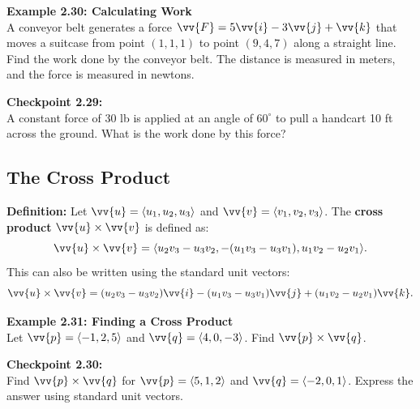 \documentclass{article}
\begin{document}
\begin{examplebox}
    \textbf{Example 2.30: Calculating Work} \\
    A conveyor belt generates a force \(\vv{F} = 5\vv{i} - 3\vv{j} + \vv{k}\) that moves a suitcase from point \((1, 1, 1)\) to point \((9, 4, 7)\) along a straight line. Find the work done by the conveyor belt. The distance is measured in meters, and the force is measured in newtons.
\end{examplebox}

\begin{exercisebox}
    \textbf{Checkpoint 2.29:} \\
    A constant force of 30 lb is applied at an angle of \(60^\circ\) to pull a handcart 10 ft across the ground. What is the work done by this force?
\end{exercisebox}

\subsection*{The Cross Product}

\begin{definitionbox}
    \textbf{Definition:} Let \(\vv{u} = \langle u_1, u_2, u_3 \rangle\) and \(\vv{v} = \langle v_1, v_2, v_3 \rangle\). The \textbf{cross product} \(\vv{u} \times \vv{v}\) is defined as:
    \[
    \vv{u} \times \vv{v} = \langle u_2 v_3 - u_3 v_2, -(u_1 v_3 - u_3 v_1), u_1 v_2 - u_2 v_1 \rangle.
    \]
    This can also be written using the standard unit vectors:
    \[
    \vv{u} \times \vv{v} = (u_2 v_3 - u_3 v_2) \vv{i} - (u_1 v_3 - u_3 v_1) \vv{j} + (u_1 v_2 - u_2 v_1) \vv{k}.
    \]
\end{definitionbox}

\begin{examplebox}
    \textbf{Example 2.31: Finding a Cross Product} \\
    Let \(\vv{p} = \langle -1, 2, 5 \rangle\) and \(\vv{q} = \langle 4, 0, -3 \rangle\). Find \(\vv{p} \times \vv{q}\).
\end{examplebox}

\begin{exercisebox}
    \textbf{Checkpoint 2.30:} \\
    Find \(\vv{p} \times \vv{q}\) for \(\vv{p} = \langle 5, 1, 2 \rangle\) and \(\vv{q} = \langle -2, 0, 1 \rangle\). Express the answer using standard unit vectors.
\end{exercisebox}
\end{document}
